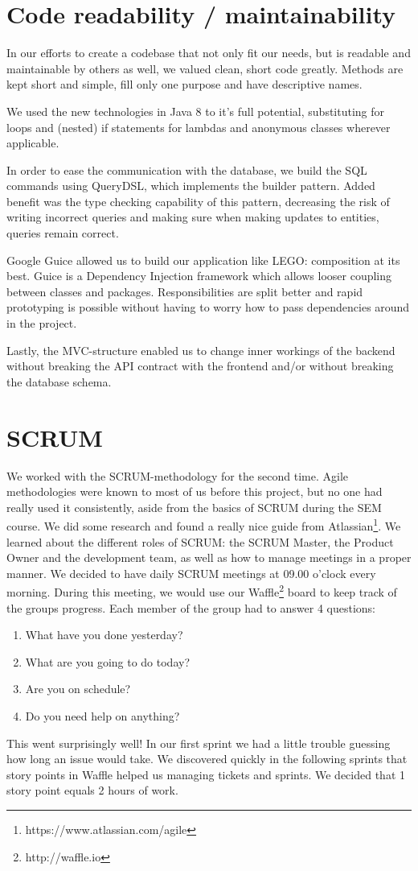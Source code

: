 \section{Code readability / maintainability}
In our efforts to create a codebase that not only fit our needs, but is readable and maintainable by others as well, we valued clean, short code greatly.
Methods are kept short and simple, fill only one purpose and have descriptive names. 

We used the new technologies in Java 8 to it's full potential, substituting for loops and (nested) if statements for lambdas and anonymous classes wherever applicable.

In order to ease the communication with the database, we build the SQL commands using QueryDSL, which implements the builder pattern.
Added benefit was the type checking capability of this pattern, decreasing the risk of writing incorrect queries and making sure when making updates to entities, queries remain correct.

Google Guice allowed us to build our application like LEGO\texttrademark : composition at its best.
Guice is a Dependency Injection framework which allows looser coupling between classes and packages.
Responsibilities are split better and rapid prototyping is possible without having to worry how to pass dependencies around in the project.

Lastly, the MVC-structure enabled us to change inner workings of the backend without breaking the API contract with the frontend and/or without breaking the database schema.

\section{SCRUM}
We worked with the SCRUM-methodology for the second time.
Agile methodologies were known to most of us before this project, but no one had really used it consistently, aside from the basics of SCRUM during the SEM course.
We did some research and found a really nice guide from Atlassian\footnote{https://www.atlassian.com/agile}.
We learned about the different roles of SCRUM: the SCRUM Master, the Product Owner and the development team, as well as how to manage meetings in a proper manner.
We decided to have daily SCRUM meetings at 09.00 o'clock every morning.
During this meeting, we would use our Waffle\footnote{http://waffle.io} board to keep track of the groups progress.
Each member of the group had to answer 4 questions:
\begin{enumerate}
\item What have you done yesterday?
\item What are you going to do today?
\item Are you on schedule?
\item Do you need help on anything?
\end{enumerate}
This went surprisingly well!
In our first sprint we had a little trouble guessing how long an issue would take.
We discovered quickly in the following sprints that story points in Waffle helped us managing tickets and sprints.
We decided that 1 story point equals 2 hours of work.

